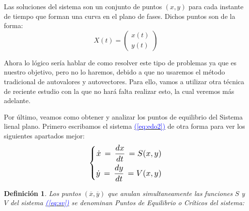 \documentclass[12pt,a4paper]{report} %
\newtheorem{definicion}{Definición}[chapter]
\newtheorem{definicion}{Definición}[chapter] %
\newcommand{\eref}[1]{\hyperref[#1]{\textcolor{blue}{(\ref*{#1})}}}
\newcommand{\eref}[1]{\hyperref[#1]{\textcolor{blue}{\textit{(\ref*{#1})}}}}
\begin{document}
	\noindent Las soluciones del sistema son un conjunto de puntos $(x,y)$ para cada instante de tiempo que forman una curva en el plano de fases. Dichos puntos son de la forma:
	\begin{equation}
		\label{eq:puntos}
		X(t)=\begin{pmatrix}
			x(t) \\ y(t)
		\end{pmatrix}
	\end{equation}\smallskip
	
	\noindent Ahora lo lógico sería hablar de como resolver este tipo de problemas ya que es nuestro objetivo, pero no lo haremos, debido a que no usaremos el método tradicional de autovalores y autovectores. Para ello, vamos a utilizar otra técnica de reciente estudio con la que no hará falta realizar esto, la cual veremos más adelante.
	
	\newpage
	
	Por último, veamos como obtener y analizar los puntos de equilibrio del Sistema lienal plano. Primero escribamos el sistema \eref{eq:edo2} de otra forma para ver los siguientes apartados mejor:
	\begin{equation}
		\label{eq:sv}
		\scalebox{1.2}{$\displaystyle
			\left\{
			\begin{aligned}
				\dot{x}\,=\,\frac{dx}{dt}\,=S(x,y) \\
				\dot{y}\,=\,\frac{dy}{dt}\,=V(x,y)
			\end{aligned}
			\right.
			$}
	\end{equation}\smallskip
	
	\begin{definicion}
		Los puntos $(\overline{x},\overline{y})$ que anulan simultaneamente las funciones $S$ y $V$ del sistema \eref{eq:sv} se denominan Puntos de Equilibrio o Críticos del sistema:
	\end{definicion}
\end{document}
